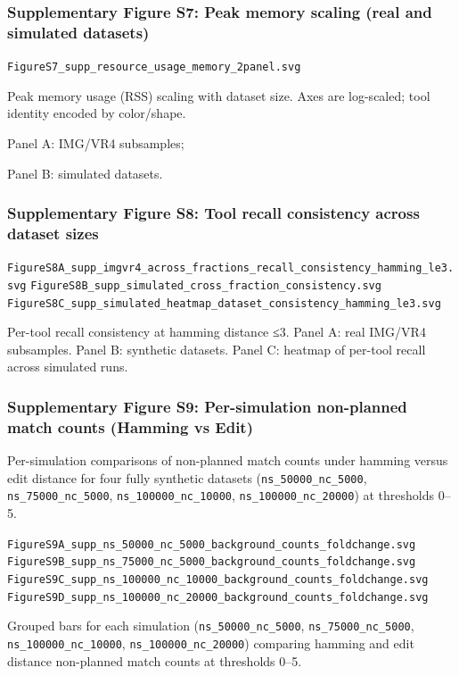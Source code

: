 \documentclass[
]{article}
\begin{document}
\subsubsection{Supplementary Figure S7: Peak memory scaling (real and
simulated datasets)}\label{fig-supp-resource-memory}

\texttt{FigureS7\_supp\_resource\_usage\_memory\_2panel.svg}

Peak memory usage (RSS) scaling with dataset size. Axes are log-scaled;
tool identity encoded by color/shape.

Panel A: IMG/VR4 subsamples;

Panel B: simulated datasets.

\subsubsection{Supplementary Figure S8: Tool recall consistency across
dataset sizes}\label{fig-supp-sim-consistency}

\texttt{FigureS8A\_supp\_imgvr4\_across\_fractions\_recall\_consistency\_hamming\_le3.svg}
\texttt{FigureS8B\_supp\_simulated\_cross\_fraction\_consistency.svg}
\texttt{FigureS8C\_supp\_simulated\_heatmap\_dataset\_consistency\_hamming\_le3.svg}

Per-tool recall consistency at hamming distance ≤3. Panel A: real
IMG/VR4 subsamples. Panel B: synthetic datasets. Panel C: heatmap of
per-tool recall across simulated runs.

\subsubsection{Supplementary Figure S9: Per-simulation non-planned match
counts (Hamming vs Edit)}\label{fig-supp-per-sim-background}

Per-simulation comparisons of non-planned match counts under hamming
versus edit distance for four fully synthetic datasets
(\texttt{ns\_50000\_nc\_5000}, \texttt{ns\_75000\_nc\_5000},
\texttt{ns\_100000\_nc\_10000}, \texttt{ns\_100000\_nc\_20000}) at
thresholds 0--5.

\texttt{FigureS9A\_supp\_ns\_50000\_nc\_5000\_background\_counts\_foldchange.svg}
\texttt{FigureS9B\_supp\_ns\_75000\_nc\_5000\_background\_counts\_foldchange.svg}
\texttt{FigureS9C\_supp\_ns\_100000\_nc\_10000\_background\_counts\_foldchange.svg}
\texttt{FigureS9D\_supp\_ns\_100000\_nc\_20000\_background\_counts\_foldchange.svg}

Grouped bars for each simulation (\texttt{ns\_50000\_nc\_5000},
\texttt{ns\_75000\_nc\_5000}, \texttt{ns\_100000\_nc\_10000},
\texttt{ns\_100000\_nc\_20000}) comparing hamming and edit distance
non-planned match counts at thresholds 0--5.
\end{document}
